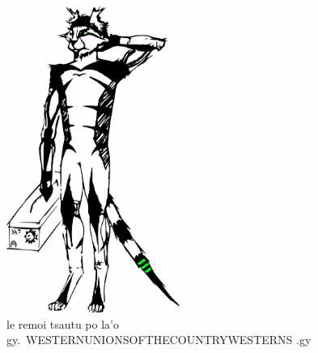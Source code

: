 \documentclass{report}
\newcommand\imageheight{10cm}
\begin{document}
\begin{figure}[ht]
	\centering
	\includegraphics[height=\imageheight]{50x/toolbox/s1v2.jpg}
	\caption[center]{le remoi tsautu po la'o gy.\ WESTERNUNIONSOFTHECOUNTRYWESTERNS .gy}
\end{figure}
\end{document}
